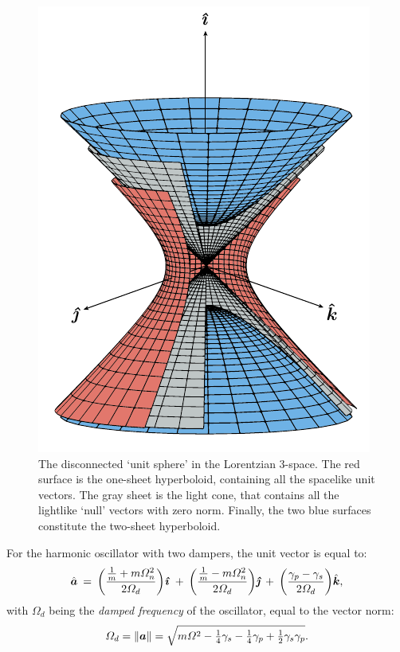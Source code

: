 \begin{figure}[ht!]
    \centering
    \includegraphics[]{media/other/hyperboloid.pdf}
    \caption{The disconnected `unit sphere' in the Lorentzian 3-space. The red surface is the one-sheet hyperboloid, containing all the spacelike unit vectors. The gray sheet is the light cone, that contains all the lightlike `null' vectors with zero norm. Finally, the two blue surfaces constitute the two-sheet hyperboloid.}
    \label{fig:hyperboloids}
\end{figure}

For the harmonic oscillator with two dampers, the unit vector is equal to:
\begin{equation}
    \uvec{a} \:= \:\qty(\frac{\tfrac{1}{m} + m\Omega_n^2}{2\Omega_d})\quati \: + \:\qty(\frac{\tfrac{1}{m} - m\Omega_n^2}{2\Omega_d})\quatj \:+ \:\qty(\frac{\gamma_p - \gamma_s}{2\Omega_d})\quatk,
    \label{eq:ddho_vector}
\end{equation}
with \(\Omega_d\) being the \emph{damped frequency} of the oscillator, equal to the vector norm:
\begin{equation}
    \Omega_d = \norm{\vec{a}} = \sqrt{m\Omega^2 - \tfrac{1}{4}\gamma_s - \tfrac{1}{4}\gamma_p + \tfrac{1}{2}\gamma_s \gamma_p}.
\end{equation}

